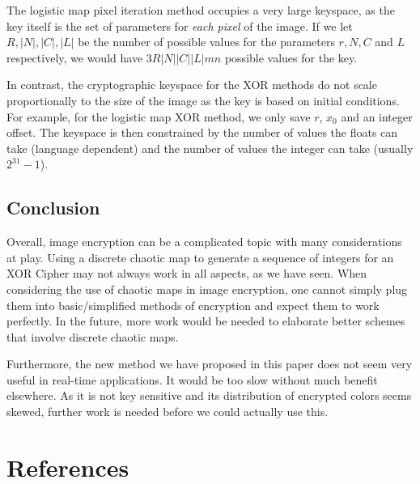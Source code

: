 \documentclass[10pt]{article}
\begin{document}
    The logistic map pixel iteration method occupies a very large keyspace, as the key itself is the set of parameters for \textit{each pixel} of the image. If we let $R, |N|, |C|, |L|$ be the number of possible values for the parameters $r, N, C$ and $L$ respectively, we would have $3R|N||C||L|mn$ possible values for the key.
    
    In contrast, the cryptographic keyspace for the XOR methods do not scale proportionally to the size of the image as the key is based on initial conditions. For example, for the logistic map XOR method, we only save $r$, $x_0$ and an integer offset. The keyspace is then constrained by the number of values the floats can take (language dependent) and the number of values the integer can take (usually $2^{31} -1$). 
    
    
    
    \subsection{Conclusion}
    
    Overall, image encryption can be a complicated topic with many considerations at play. Using a discrete chaotic map to generate a sequence of integers for an XOR Cipher may not always work in all aspects, as we have seen. When considering the use of chaotic maps in image encryption, one cannot simply plug them into basic/simplified methods of encryption and expect them to work perfectly. In the future, more work would be needed to elaborate better schemes that involve discrete chaotic maps.
    
    Furthermore, the new method we have proposed in this paper does not seem very useful in real-time applications. It would be too slow without much benefit elsewhere. As it is not key sensitive and its distribution of encrypted colors seems skewed, further work is needed before we could actually use this.
    
    \section{References}
    \begingroup
    \renewcommand{\section}[2]{}%
     
    
    \endgroup
    
\end{document}
